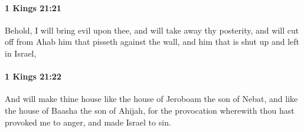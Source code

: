 		\paragraph{1 Kings 21:21} %
			\label{1KINGS-21-21}

			Behold, I will bring evil upon thee, and will take away thy posterity, and will cut off from Ahab him that pisseth against the wall, and him that is shut up and left in Israel,


		\paragraph{1 Kings 21:22} %
			\label{1KINGS-21-22}

			And will make thine house like the house of Jeroboam the son of Nebat, and like the house of Baasha the son of Ahijah, for the provocation wherewith thou hast provoked me to anger, and made Israel to sin.

